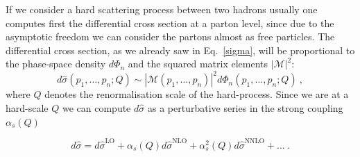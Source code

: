 \documentclass[../main/main.tex]{subfiles}
\begin{document}
If we consider a hard scattering  process between two hadrons usually one computes first the differential cross section at a parton level, since due to the asymptotic freedom we can consider the partons almost as free particles.
The differential cross section, as we already saw in Eq.~\ref{sigma}, will be proportional to the phase-space density $d\Phi_n$ and the squared
matrix elements $|\mathcal{M}|^2$:
\begin{equation}
	\label{partonic cross section}
	d\hat{\sigma}(p_1,\dots, p_n; Q) \sim |\mathcal{M}(p_1,\dots, p_n)|^2 d\Phi_n(p_1,\dots, p_n; Q)  \ ,
\end{equation}
where $Q$ denotes the renormalisation scale of the hard-process. Since we are at a hard-scale $Q$ we can compute $d\hat{\sigma}$ as a 
perturbative series in the strong coupling  $\alpha_s(Q)$

\begin{equation}
	d\hat{\sigma} = d\hat{\sigma}^{\text{LO}} + \alpha_s(Q)  d\hat{\sigma}^{\text{NLO}} + \alpha^2_s(Q)  d\hat{\sigma}^{\text{NNLO}} + \dots
	\ .
\end{equation}
\end{document}
